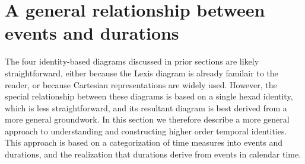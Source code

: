 \documentclass[12pt,oneside,a4paper]{article} %
\begin{document}

\FloatBarrier

\section{A general relationship between events and durations}
The four identity-based diagrams discussed in prior sections are likely
straightforward, either because the Lexis diagram is already
familair to the reader, or because Cartesian representations are widely used.
However, the special relationship between these diagrams is based on a single
hexad identity, which is less straightforward, and its resultant diagram is best derived from a more
general groundwork. In this section we therefore describe a more general
approach to understanding and constructing higher order temporal identities.
This approach is based on a categorization of time measures into events and
durations, and the realization that durations derive from events in calendar
time.
\end{document}
